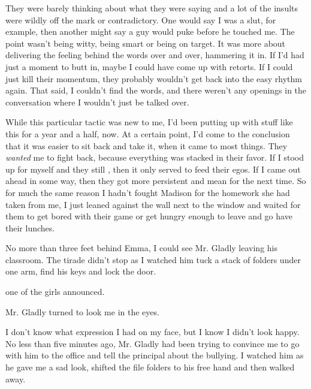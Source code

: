 They were barely thinking about what they were saying and a lot of the insults were wildly off the mark or contradictory. One would say I was a slut, for example, then another might say a guy would puke before he touched me. The point wasn't being witty, being smart or being on target. It was more about delivering the feeling behind the words over and over, hammering it in. If I'd had just a moment to butt in, maybe I could have come up with retorts. If I could just kill their momentum, they probably wouldn't get back into the easy rhythm again. That said, I couldn't find the words, and there weren't any openings in the conversation where I wouldn't just be talked over.

While this particular tactic was new to me, I'd been putting up with stuff like this for a year and a half, now. At a certain point, I'd come to the conclusion that it was easier to sit back and take it, when it came to most things. They {\em wanted} me to fight back, because everything was stacked in their favor. If I stood up for myself and they still , then it only served to feed their egos. If I came out ahead in some way, then they got more persistent and mean for the next time. So for much the same reason I hadn't fought Madison for the homework she had taken from me, I just leaned against the wall next to the window and waited for them to get bored with their game or get hungry enough to leave and go have their lunches.





No more than three feet behind Emma, I could see Mr. Gladly leaving his classroom. The tirade didn't stop as I watched him tuck a stack of folders under one arm, find his keys and lock the door.

 one of the girls announced.

Mr. Gladly turned to look me in the eyes.


I don't know what expression I had on my face, but I know I didn't look happy. No less than five minutes ago, Mr. Gladly had been trying to convince me to go with him to the office and tell the principal about the bullying. I watched him as he gave me a sad look, shifted the file folders to his free hand and then walked away.

